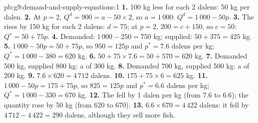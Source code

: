 \begin{solution}{pb:g9:demand-and-supply-equations:1}
\textbf{1.} 100 kg less for each 2 dalens: 50 kg per dalen.
\textbf{2.} At $p = 2$, $Q^d = 900 = a - 50 \times 2$, so $a = 1\,000$: $Q^d = 1\,000 - 50p$.
\textbf{3.} The  rises by 150 kg for each 2 dalens: $d = 75$; at $p = 2$, $200 = c +
150$, so $c = 50$: $Q^s = 50 + 75p$.
\textbf{4.} Demanded: $1\,000 - 250 = 750$ kg; supplied: $50 + 375 = 425$ kg.
\textbf{5.} $1\,000 - 50p = 50 + 75p$, so $950 = 125p$ and $p^* = 7.6$ dalens per kg; $Q^* = 1\,000 - 380
= 620$ kg.
\textbf{6.} $50 + 75 \times 7.6 = 50 + 570 = 620$ kg.
\textbf{7.} Demanded 500 kg, supplied 800 kg: a  of 300 kg.
\textbf{8.} Demanded 700 kg, supplied 500 kg: a  of 200 kg.
\textbf{9.} $7.6 \times 620 = 4\,712$ dalens.
\textbf{10.} $175 + 75 \times 6 = 625$ kg.
\textbf{11.} $1\,000 - 50p = 175 + 75p$, so $825 = 125p$ and $p^* = 6.6$ dalens per kg; $Q^* = 1\,000 -
330 = 670$ kg.
\textbf{12.} The  fell by 1 dalen per kg (from $7.6$ to $6.6$); the quantity rose by 50 kg (from 620
to 670).
\textbf{13.} $6.6 \times 670 = 4\,422$ dalens: it fell by $4\,712 - 4\,422 = 290$ dalens, although they
sell more fish.
\end{solution}

